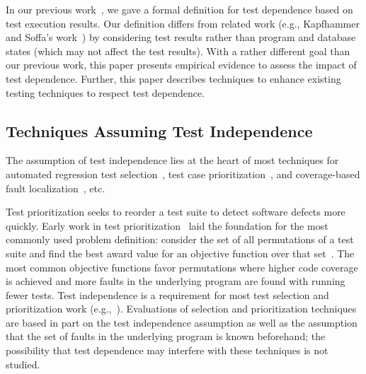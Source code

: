 In our previous work~\cite{testdependence}, we gave a formal definition
for test dependence based on test execution results.
Our definition differs from related work (e.g.,
Kapfhammer and Soffa's work~\cite{kapfhammeretal:FSE:2003}) by considering
test results rather than program and database states (which
may not affect the test results). 
%
With a rather different goal than our previous work, this paper
presents empirical evidence to assess the impact of
test dependence. Further, this paper describes techniques
to enhance existing testing techniques to respect
test dependence.

\subsection{Techniques Assuming Test Independence}
The assumption of test independence lies at the heart of most
techniques for automated regression test selection~\cite{harroldetal:OOPSLA:2001, Orso:2004:SRT,
Briand:2009:ART, Zhang:2012:RMT, Nanda:2011:RTP},
test case prioritization~\cite{Elbaum:2000:PTC:347324.348910, Kim:2002:HTP:581339.581357, Rummel:2005:TPR:1066677.1067016, Srivastava:2002:EPT:566172.566187, Jiang:2009:ART}, 
and coverage-based fault localization~\cite{Steimann:2013, Zhang:2013:IMF, Jones:2002:VTI}, etc. 


Test prioritization seeks to reorder a test suite to detect
software defects more quickly. 
Early work in test
prioritization~\cite{Wong:1997:SER:851010.856115,Rothermel:1999:TCP:519621.853398}
laid the foundation for the most commonly used problem definition:
consider the set of all permutations of a test suite and find the best
award value for an objective function over that
set~\cite{Elbaum:2000:PTC:347324.348910}.  The most common objective
functions favor permutations where higher code coverage
is achieved and more faults in the underlying
program  are found with running fewer tests.
Test independence is
a requirement for most test selection and prioritization work (e.g.,~\cite[p.~1500]{Rummel:2005:TPR:1066677.1067016}).
Evaluations of selection and prioritization techniques~\cite[\emph{et alia}]{Rothermel:1999:TCP:519621.853398,Do:2010:ETC:1907658.1908088}
are based in part on the test independence
assumption as well as the assumption that the set of faults in the underlying
program is known beforehand; the possibility that test dependence may
interfere with these techniques is not studied.


